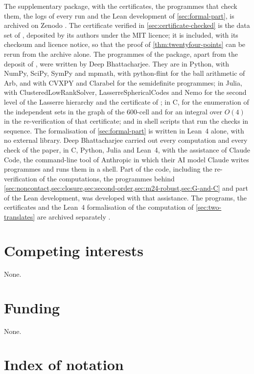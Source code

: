 \documentclass[11pt,reqno]{amsart}
\renewcommand{\_}{\origunderscore\allowbreak}
\numberwithin{equation}{section}
\theoremstyle{plain}
\theoremstyle{definition}
\theoremstyle{remark}
\begin{document}
The supplementary package, with the certificates, the programmes that
check them, the logs of every run and the Lean development of
\cref{sec:formal-part}, is archived on Zenodo
\cite{D4Zenodo}. The certificate verified in \cref{sec:certificate-checked}
is the data set of \cite{LLM24data}, deposited by its authors under the MIT
licence; it is included, with its checksum and licence notice, so that the
proof of \cref{thm:twentyfour-points} can be rerun from the archive alone.
The programmes of the package, apart from the deposit of \cite{LLM24data},
were written by Deep Bhattacharjee. They are in Python, with NumPy,
SciPy, SymPy and mpmath, with python-flint for the ball arithmetic of Arb,
and with CVXPY and Clarabel for the semidefinite programmes; in Julia, with
ClusteredLowRankSolver, LasserreSphericalCodes and Nemo for the second
level of the Lasserre hierarchy and the certificate of \cite{LLM24data};
in C, for the enumeration of the independent sets in the graph of the
600-cell and for an integral over $O(4)$ in the re-verification of that
certificate; and in shell scripts that run the checks in sequence. The
formalisation of \cref{sec:formal-part} is written in Lean~4 alone, with no
external library. Deep Bhattacharjee carried out every computation and
every check of the paper, in C, Python, Julia and Lean~4, with the
assistance of Claude Code, the command-line tool of Anthropic in which
their AI model Claude writes programmes and runs them in a shell. Part of
the code, including the re-verification of the computations, the
programmes behind
\cref{sec:noncontact,sec:closure,sec:second-order,sec:m24-robust,sec:G-and-C}
and part of the Lean development, was developed with that assistance.
The programs, the certificates and the Lean~4 formalisation of the
computation of \cref{sec:two-translates} are archived separately
\cite{TwoTranslatesZenodo}.

\section*{Competing interests}

None.

\section*{Funding}

None.

\appendix
\section{Index of notation}\label{app:notation}
\end{document}
